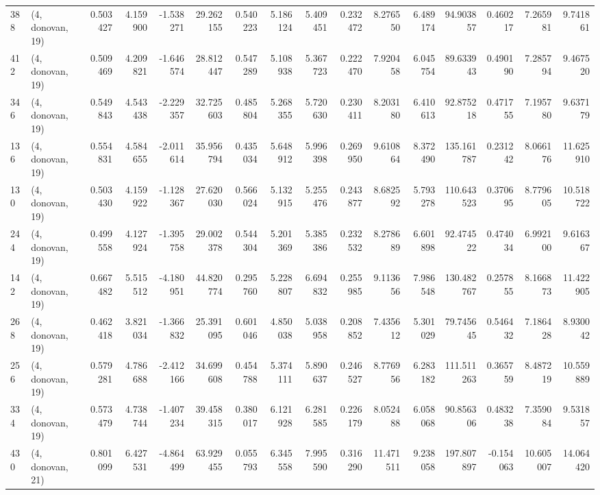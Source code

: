 \begin{tabular}{llrrrrrrrrrrrrrr}
388 &  (4, donovan, 19) &   0.503427 &   4.159900 &  -1.538271 &    29.262155 &   0.540223 &   5.186124 &   5.409451 &  0.232472 &   8.276550 &   6.489174 &    94.903857 &   0.460217 &   7.265981 &   9.741861 \\
412 &  (4, donovan, 19) &   0.509469 &   4.209821 &  -1.646574 &    28.812447 &   0.547289 &   5.108938 &   5.367723 &  0.222470 &   7.920458 &   6.045754 &    89.633943 &   0.490190 &   7.285794 &   9.467520 \\
346 &  (4, donovan, 19) &   0.549843 &   4.543438 &  -2.229357 &    32.725603 &   0.485804 &   5.268355 &   5.720630 &  0.230411 &   8.203180 &   6.410613 &    92.875218 &   0.471755 &   7.195780 &   9.637179 \\
136 &  (4, donovan, 19) &   0.554831 &   4.584655 &  -2.011614 &    35.956794 &   0.435034 &   5.648912 &   5.996398 &  0.269950 &   9.610864 &   8.372490 &   135.161787 &   0.231242 &   8.066176 &  11.625910 \\
130 &  (4, donovan, 19) &   0.503430 &   4.159922 &  -1.128367 &    27.620030 &   0.566024 &   5.132915 &   5.255476 &  0.243877 &   8.682592 &   5.793278 &   110.643523 &   0.370695 &   8.779605 &  10.518722 \\
244 &  (4, donovan, 19) &   0.499558 &   4.127924 &  -1.395758 &    29.002378 &   0.544304 &   5.201369 &   5.385386 &  0.232532 &   8.278689 &   6.601898 &    92.474522 &   0.474034 &   6.992100 &   9.616367 \\
142 &  (4, donovan, 19) &   0.667482 &   5.515512 &  -4.180951 &    44.820774 &   0.295760 &   5.228807 &   6.694832 &  0.255985 &   9.113656 &   7.986548 &   130.482767 &   0.257855 &   8.166873 &  11.422905 \\
268 &  (4, donovan, 19) &   0.462418 &   3.821034 &  -1.366832 &    25.391095 &   0.601046 &   4.850038 &   5.038958 &  0.208852 &   7.435612 &   5.301029 &    79.745645 &   0.546432 &   7.186428 &   8.930042 \\
256 &  (4, donovan, 19) &   0.579281 &   4.786688 &  -2.412166 &    34.699608 &   0.454788 &   5.374111 &   5.890637 &  0.246527 &   8.776956 &   6.283182 &   111.511263 &   0.365759 &   8.487219 &  10.559889 \\
334 &  (4, donovan, 19) &   0.573479 &   4.738744 &  -1.407234 &    39.458315 &   0.380017 &   6.121928 &   6.281585 &  0.226179 &   8.052488 &   6.058068 &    90.856306 &   0.483238 &   7.359084 &   9.531857 \\
430 &  (4, donovan, 21) &   0.801099 &   6.427531 &  -4.864499 &    63.929455 &   0.055793 &   6.345558 &   7.995590 &  0.316290 &  11.471511 &   9.238058 &   197.807897 &  -0.154063 &  10.605007 &  14.064420 \\

\end{tabular}
